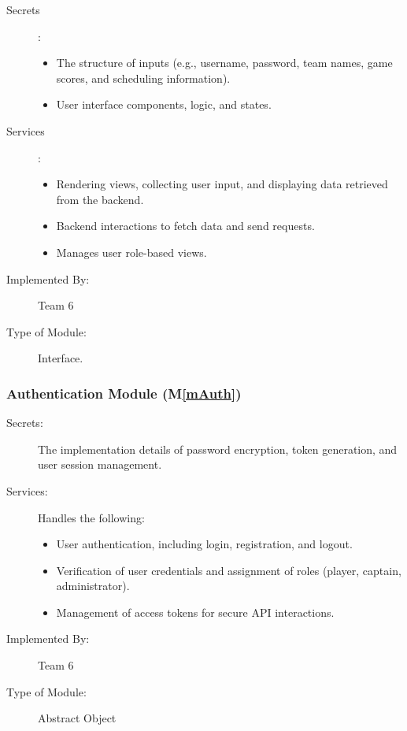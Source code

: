 \documentclass[12pt, titlepage]{article}
\newcommand{\mref}[1]{M\ref{#1}}
\begin{document}
\begin{description}
  \item[Secrets]:
        \begin{itemize}
          \item The structure of inputs (e.g., username, password, team names, game scores, and scheduling information).
          \item User interface components, logic, and states.
        \end{itemize}

  \item[Services]:
        \begin{itemize}
          \item Rendering views, collecting user input, and displaying data retrieved from the backend.
          \item Backend interactions to fetch data and send requests.
          \item Manages user role-based views.
        \end{itemize}

  \item[Implemented By:] Team 6

  \item[Type of Module:] Interface.

\end{description}

\subsubsection{Authentication Module (\mref{mAuth})}

\begin{description}
  \item[Secrets:] The implementation details of password encryption, token generation, and user session management.

  \item[Services:] Handles the following:
        \begin{itemize}
          \item User authentication, including login, registration, and logout.
          \item Verification of user credentials and assignment of roles (player, captain, administrator).
          \item Management of access tokens for secure API interactions.
        \end{itemize}

  \item[Implemented By:] Team 6

  \item[Type of Module:] Abstract Object
\end{description}
\end{document}
